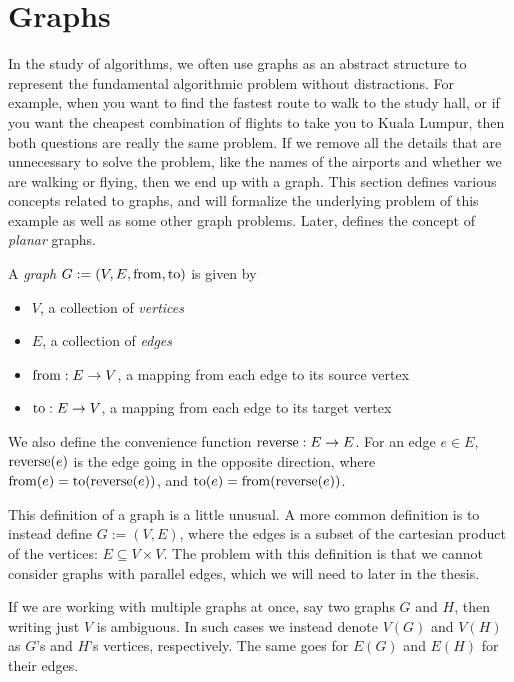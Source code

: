 \section{Graphs}
\label{section:graphs}
In the study of algorithms, we often use graphs as an abstract structure to represent the fundamental algorithmic problem without distractions. For example, when you want to find the fastest route to walk to the study hall, or if you want the cheapest combination of flights to take you to Kuala Lumpur, then both questions are really the same problem. If we remove all the details that are unnecessary to solve the problem, like the names of the airports and whether we are walking or flying, then we end up with a graph. This section defines various concepts related to graphs, and  will formalize the underlying problem of this example as well as some other graph problems. Later,  defines the concept of \emph{planar} graphs.

\begin{definition}[Graph]
    A \emph{graph} $G := (V, E, \operatorname{from}, \operatorname{to})$ is given by
\begin{itemize}
    \item $V$, a collection of \emph{vertices}
    \item $E$, a collection of \emph{edges}
    \item $\operatorname{from} : E \rightarrow V$, a mapping from each edge to its source vertex
    \item $\operatorname{to} : E \rightarrow V$, a mapping from each edge to its target vertex 
\end{itemize}
\end{definition}

We also define the convenience function $\operatorname{reverse} : E \rightarrow E$. For an edge $e \in E$, $\operatorname{reverse}(e)$ is the edge going in the opposite direction, where $\operatorname{from}(e) = \operatorname{to}(\operatorname{reverse}(e))$, and $\operatorname{to}(e) = \operatorname{from}(\operatorname{reverse}(e))$.

This definition of a graph is a little unusual. A more common definition is to instead define $G := (V, E)$, where the edges is a subset of the cartesian product of the vertices: $E \subseteq V \times V$. The problem with this definition is that we cannot consider graphs with parallel edges, which we will need to later in the thesis.

If we are working with multiple graphs at once, say two graphs $G$ and $H$, then writing just $V$ is ambiguous. In such cases we instead denote $V(G)$ and $V(H)$ as $G$'s and $H$'s vertices, respectively. The same goes for $E(G)$ and $E(H)$ for their edges.

